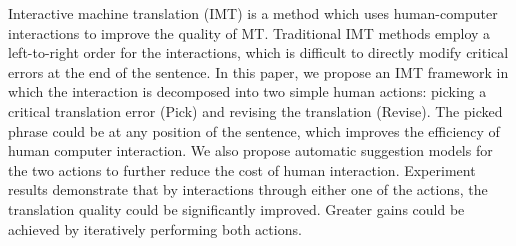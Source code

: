 Interactive machine translation (IMT) is a method which uses human-computer interactions to improve the quality of MT. Traditional IMT methods employ a left-to-right order for the interactions, which is difficult to directly modify critical errors at the end of the sentence. In this paper, we propose an IMT framework in which the interaction is decomposed into two simple human actions: picking a critical translation error (Pick) and revising the translation (Revise). The picked phrase could be at any position of the sentence, which improves the efficiency of human computer interaction. We also propose automatic suggestion models for the two actions to further reduce the cost of human interaction. Experiment results demonstrate that by interactions through either one of the actions, the translation quality could be significantly improved. Greater gains could be achieved by iteratively performing both actions.
